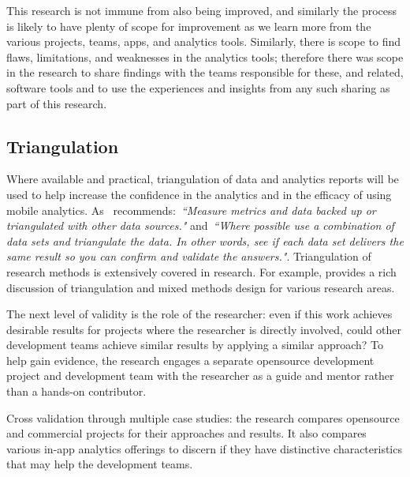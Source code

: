 This research is not immune from also being improved, and similarly the process is likely to have plenty of scope for improvement as we learn more from the various projects, teams, apps, and analytics tools. Similarly, there is scope to find flaws, limitations, and weaknesses in the analytics tools; therefore there was scope in the research to share findings with the teams responsible for these, and related, software tools and to use the experiences and insights from any such sharing as part of this research.


\subsection{Triangulation}
Where available and practical, triangulation%
of data and analytics reports will be used to help increase the confidence in the analytics and in the efficacy of using mobile analytics. As~\citep{marr2015bigdatabook} recommends:~\emph{``Measure metrics and data backed up or triangulated with other data sources."} and~\emph{``Where possible use a combination of data sets and triangulate the data. In other words, see if each data set delivers the same result so you can confirm and validate the answers."}. Triangulation of research methods is extensively covered in research. For example, \citep{fielding2012_triangulation_and_mixed_methods_designs} provides a rich discussion of triangulation and mixed methods design for various research areas. %

The next level of validity is the role of the researcher: even if this work achieves desirable results for projects where the researcher is directly involved, could other development teams achieve similar results by applying a similar approach? To help gain evidence, the research engages a separate opensource development project and development team with the researcher as a guide and mentor rather than a hands-on contributor.

Cross validation through multiple case studies: the research compares opensource and commercial projects for their approaches and results. It also compares various in-app analytics offerings to discern if they have distinctive characteristics that may help the development teams.


